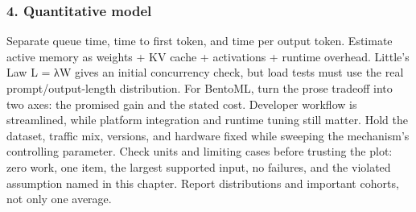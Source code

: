 \subsubsection*{4. Quantitative model}
Separate queue time, time to first token, and time per output token. Estimate active memory as weights + KV cache + activations + runtime overhead. Little's Law L = λW gives an initial concurrency check, but load tests must use the real prompt/output-length distribution.
For BentoML, turn the prose tradeoff into two axes: the promised gain and the stated cost. Developer workflow is streamlined, while platform integration and runtime tuning still matter. Hold the dataset, traffic mix, versions, and hardware fixed while sweeping the mechanism's controlling parameter.
Check units and limiting cases before trusting the plot: zero work, one item, the largest supported input, no failures, and the violated assumption named in this chapter. Report distributions and important cohorts, not only one average.
